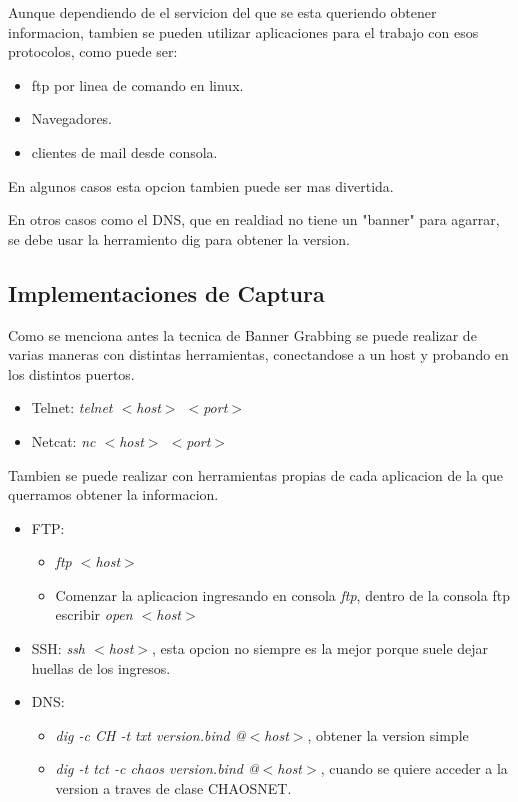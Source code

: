 \documentclass[a4paper]{article}
\begin{document}
Aunque dependiendo de el servicion del que se esta queriendo obtener informacion, tambien se pueden utilizar aplicaciones para el trabajo con esos protocolos, como puede ser:
\begin{itemize}
\item ftp por linea de comando en linux.
\item Navegadores.
\item clientes de mail desde consola.
 \end{itemize}
 
 En algunos casos esta opcion tambien puede ser mas divertida.
 
 En otros casos como el DNS, que en realdiad no tiene un "banner" para agarrar, se debe usar la herramiento dig para obtener la version.
 
\subsection{Implementaciones de Captura}
 
Como se menciona antes la tecnica de Banner Grabbing se puede realizar de varias maneras con distintas herramientas, conectandose a un host y probando en los distintos puertos.

\begin{itemize}
\item Telnet: \textit{telnet $<$host$>$  $<$port$>$}

\item Netcat: \textit{nc $<$host$>$ $<$port$>$}
\end{itemize} 

\clearpage

Tambien se puede realizar con herramientas propias de cada aplicacion de la que querramos obtener la informacion.

\begin{itemize}
\item FTP: \begin{itemize}
			\item \textit{ftp $<$host$>$}
			\item Comenzar la aplicacion ingresando en consola \textit{ftp}, dentro de la consola ftp escribir \textit{open $<$host$>$}
			\end{itemize}
			
\item SSH: \textit{ssh $<$host$>$}, esta opcion no siempre es la mejor porque suele dejar huellas de los ingresos.

\item DNS: \begin{itemize}
			\item \textit{dig -c CH -t txt version.bind @$<$host$>$}, obtener la version simple
			\item \textit{dig -t tct -c chaos version.bind @$<$host$>$}, cuando se quiere acceder a la version a traves de clase CHAOSNET.
			\end{itemize}
			
\end{itemize}
\end{document}
